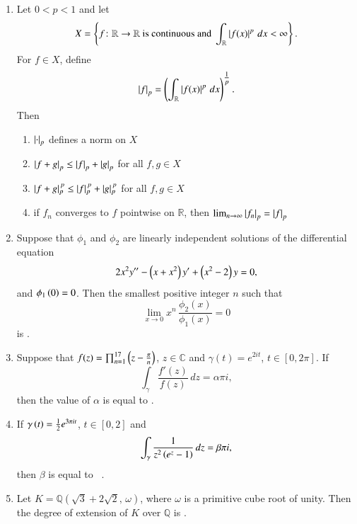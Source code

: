 \documentclass[journal,12pt,onecolumn]{IEEEtran}
\theoremstyle{remark}
\begin{document}
\begin{enumerate}[start=1, label=Q.\arabic*]
\hfill{}
\item Let $0<p<1$ and let
\[
X=\left\{ f \colon \mathbb{R}\to\mathbb{R} \ \text{is continuous and } \int_{\mathbb{R}} \left\vert f(x)\right\vert^{p}\,dx < \infty \right\}.
\]
For $f\in X$, define
\[
\left\vert f\right\vert_{p}= \left(\int_{\mathbb{R}} \left\vert f(x)\right\vert^{p} \, dx\right)^{\tfrac{1}{p}}.
\]
Then
\begin{enumerate}
\item $\left\vert\cdot\right\vert_{p}$ defines a norm on $X$
\item $\left\vert f+g\right\vert_{p}\le \left\vert f\right\vert_{p}+\left\vert g\right\vert_{p}$ for all $f,g\in X$
\item $\left\vert f+g\right\vert_{p}^{\,p}\le \left\vert f\right\vert_{p}^{\,p}+\left\vert g\right\vert_{p}^{\,p}$ for all $f,g\in X$
\item if $f_n$ converges to $f$ pointwise on $\mathbb{R}$, then $\lim_{n\to\infty}\left\vert f_n\right\vert_{p}=\left\vert f\right\vert_{p}$
\end{enumerate}

\hfill{}


\item Suppose that $\phi_1$ and $\phi_2$ are linearly independent solutions of the differential equation
\[
2x^{2}y''-\left(x+x^{2}\right)y' + \left(x^{2}-2\right)y=0,
\]
and $\phi_1\left(0\right)=0$. Then the smallest positive integer $n$ such that
\[
\lim_{x\to 0} x^{n}\,\frac{\phi_2(x)}{\phi_1(x)}=0
\]
is \underline{\hspace{2cm}}.

\hfill{}


\item Suppose that $f(z)=\prod_{n=1}^{17}\left(z-\tfrac{\pi}{n}\right)$, $z\in\mathbb{C}$ and $\gamma(t)=e^{2it}$, $t\in[0,2\pi]$. If
\[
\int_{\gamma}\frac{f'(z)}{f(z)}\,dz=\alpha \pi i,
\]
then the value of $\alpha$ is equal to \underline{\hspace{2cm}}.

\hfill{}

\item If $\gamma\left(t\right)=\tfrac{1}{2}e^{3\pi i t}$, $t\in[0,2]$ and
\[
\int_{\gamma}\frac{1}{z^{2}\left(e^{z}-1\right)}\,dz=\beta \pi i,
\]
then $\beta$ is equal to \underline{\hspace{2cm}} \ .

\hfill{}

\item Let $K=\mathbb{Q}\!\left(\sqrt{3}+2\sqrt{2},\,\omega\right)$, where $\omega$ is a primitive cube root of unity. Then the degree of extension of $K$ over $\mathbb{Q}$ is \underline{\hspace{2cm}}.


\end{enumerate}
\end{document}
